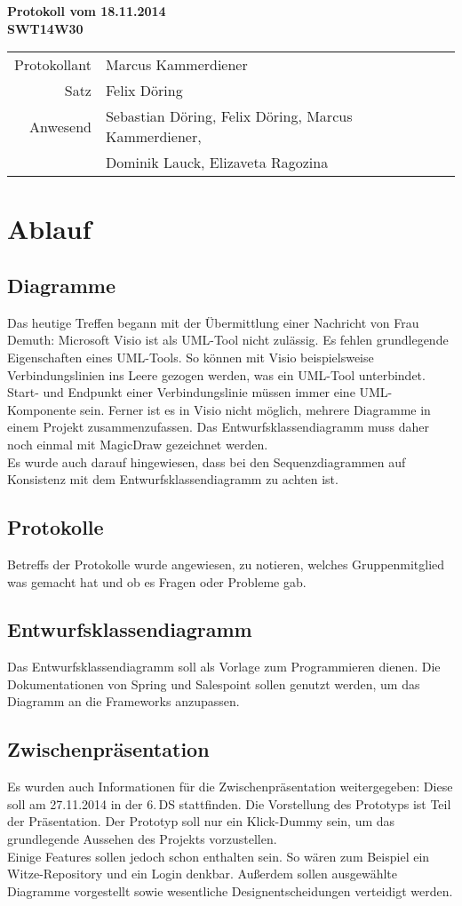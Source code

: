 \documentclass{scrartcl}
\begin{document}
\begin{center}
\LARGE \bf{Protokoll vom 18.11.2014 \\
SWT14W30}
\end{center}

\begin{tabular}{rp{10cm}}
Protokollant & Marcus Kammerdiener \\
Satz & Felix Döring \\
Anwesend & Sebastian Döring, Felix Döring, Marcus Kammerdiener,\\
& Dominik Lauck, Elizaveta Ragozina \\
\end{tabular}

\vspace*{3em}

\section{Ablauf}
\subsection{Diagramme}
Das heutige Treffen begann mit der Übermittlung einer Nachricht von Frau Demuth: Microsoft Visio ist als UML-Tool nicht zulässig. Es fehlen grundlegende Eigenschaften eines UML-Tools. So können mit Visio beispielsweise Verbindungslinien ins Leere gezogen werden, was ein UML-Tool unterbindet. Start- und Endpunkt einer Verbindungslinie müssen immer eine UML-Komponente sein. Ferner ist es in Visio nicht möglich, mehrere Diagramme in einem Projekt zusammenzufassen. Das Entwurfsklassendiagramm muss daher noch einmal mit MagicDraw gezeichnet werden. \\
Es wurde auch darauf hingewiesen, dass bei den Sequenzdiagrammen auf Konsistenz mit dem Entwurfsklassendiagramm zu achten ist.
\subsection{Protokolle}
Betreffs der Protokolle wurde angewiesen, zu notieren, welches Gruppenmitglied was gemacht hat und ob es Fragen oder Probleme gab.
\subsection{Entwurfsklassendiagramm}
Das Entwurfsklassendiagramm soll als Vorlage zum Programmieren dienen. Die Dokumentationen von Spring und Salespoint sollen genutzt werden, um das Diagramm an die Frameworks anzupassen.
\subsection{Zwischenpräsentation}
Es wurden auch Informationen für die Zwischenpräsentation weitergegeben: Diese soll am 27.11.2014 in der 6.\,DS stattfinden. Die Vorstellung des Prototyps ist Teil der Präsentation. Der Prototyp soll nur ein Klick-Dummy sein, um das grundlegende Aussehen des Projekts vorzustellen. \\
Einige Features sollen jedoch schon enthalten sein. So wären zum Beispiel ein Witze-Repository und ein Login denkbar. Außerdem sollen ausgewählte Diagramme vorgestellt sowie wesentliche Designentscheidungen verteidigt werden.
\end{document}
